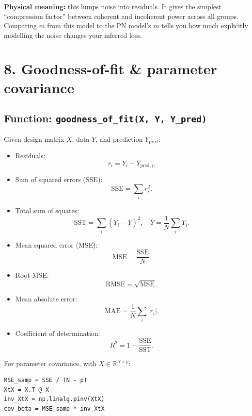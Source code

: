 \documentclass[11pt]{article}
\begin{document}
\textbf{Physical meaning:} this lumps noise into residuals. It gives the simplest ``compression factor'' between coherent and incoherent power across all groups. Comparing $m$ from this model to the PN model’s $m$ tells you how much explicitly modelling the noise changes your inferred loss.

\section*{8. Goodness-of-fit \& parameter covariance}

\subsection*{Function: \texttt{goodness\_of\_fit(X, Y, Y\_pred)}}

Given design matrix $X$, data $Y$, and prediction $Y_{\text{pred}}$:

\begin{itemize}[leftmargin=*]
  \item Residuals:
  \[
    r_i = Y_i - Y_{\text{pred},i}.
  \]

  \item Sum of squared errors (SSE):
  \[
    \mathrm{SSE} = \sum_i r_i^2.
  \]

  \item Total sum of squares:
  \[
    \mathrm{SST} = \sum_i (Y_i - \bar{Y})^2,
    \quad \bar{Y} = \frac{1}{N}\sum_i Y_i.
  \]

  \item Mean squared error (MSE):
  \[
    \mathrm{MSE} = \frac{\mathrm{SSE}}{N}.
  \]

  \item Root MSE:
  \[
    \mathrm{RMSE} = \sqrt{\mathrm{MSE}}.
  \]

  \item Mean absolute error:
  \[
    \mathrm{MAE} = \frac{1}{N}\sum_i |r_i|.
  \]

  \item Coefficient of determination:
  \[
    R^2 = 1 - \frac{\mathrm{SSE}}{\mathrm{SST}}.
  \]
\end{itemize}

For parameter covariance, with $X \in \mathbb{R}^{N\times p}$:

\begin{verbatim}
MSE_samp = SSE / (N - p)
XtX = X.T @ X
inv_XtX = np.linalg.pinv(XtX)
cov_beta = MSE_samp * inv_XtX
\end{verbatim}
\end{document}
